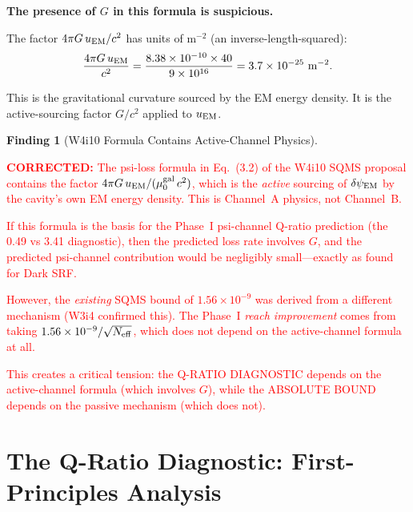 \documentclass[11pt]{article}
\newcommand{\ee}[1]{\times 10^{#1}}
\newcommand{\muG}{\mu_0^{\rm gal}}
\newcommand{\dpsiEM}{\delta\psi_{\rm EM}}
\newcommand{\corrected}[1]{\textcolor{red}{\textbf{CORRECTED:} #1}}
\theoremstyle{definition}
\newtheorem{finding}[theorem]{Finding}
\theoremstyle{remark}
\begin{document}
\textbf{The presence of $G$ in this formula is suspicious.}

The factor $4\pi G\,u_{\rm EM}/c^2$ has units of m$^{-2}$ (an
inverse-length-squared):
\begin{equation}
\frac{4\pi G\,u_{\rm EM}}{c^2} = \frac{8.38\ee{-10}\times 40}{9\ee{16}}
= 3.7\ee{-25}~\text{m}^{-2}.
\end{equation}

This is the gravitational curvature sourced by the EM energy density.
It is the active-sourcing factor $G/c^2$ applied to $u_{\rm EM}$.

\begin{finding}[W4i10 Formula Contains Active-Channel Physics]
\label{find:w4i10_active}
\corrected{The psi-loss formula in Eq.~(3.2) of the W4i10 SQMS
proposal contains the factor $4\pi G\,u_{\rm EM}/(\muG\,c^2)$, which
is the \emph{active} sourcing of $\dpsiEM$ by the cavity's own EM
energy density. This is Channel~A physics, not Channel~B.

If this formula is the basis for the Phase~I psi-channel Q-ratio
prediction (the 0.49 vs 3.41 diagnostic), then the predicted loss
rate involves $G$, and the predicted psi-channel contribution
would be negligibly small---exactly as found for Dark SRF.

However, the \emph{existing} SQMS bound of $1.56\ee{-9}$ was
derived from a different mechanism (W3i4 confirmed this). The
Phase~I \emph{reach improvement} comes from taking
$1.56\ee{-9}/\sqrt{N_{\rm eff}}$, which does not depend on the
active-channel formula at all.

This creates a critical tension: the Q-RATIO DIAGNOSTIC depends
on the active-channel formula (which involves $G$), while the
ABSOLUTE BOUND depends on the passive mechanism (which does not).}
\end{finding}


\part{The Q-Ratio Diagnostic: First-Principles Analysis}
\label{part:q_ratio}


\end{document}
